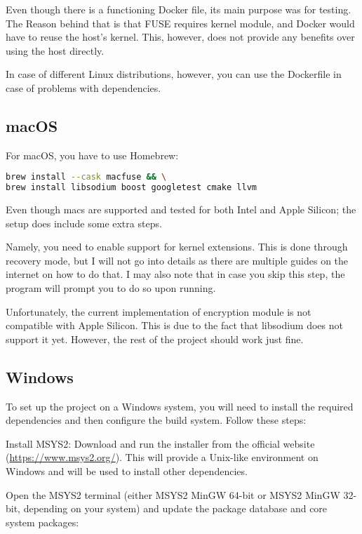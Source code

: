 Even though there is a functioning Docker file, its main purpose was for testing.
The Reason behind that is that FUSE requires kernel module, and Docker would have to reuse the host's kernel.
This, however, does not provide any benefits over using the host directly.

In case of different Linux distributions, however, you can use the Dockerfile in case of problems with dependencies.

\subsection*{macOS}

For macOS, you have to use Homebrew:

\begin{lstlisting}[language=bash, basicstyle=\ttfamily\small]
brew install --cask macfuse && \
brew install libsodium boost googletest cmake llvm
\end{lstlisting}

Even though macs are supported and tested for both Intel and Apple Silicon; the setup does include some extra steps.

Namely, you need to enable support for kernel extensions.
This is done through recovery mode, but I will not go into details as there are multiple guides on the internet on how to do that\cite{macos-kext}.
I may also note that in case you skip this step, the program will prompt you to do so upon running.

Unfortunately, the current implementation of encryption module is not compatible with Apple Silicon.
This is due to the fact that libsodium does not support it yet.
However, the rest of the project should work just fine.

\subsection*{Windows}


To set up the project on a Windows system, you will need to install the required dependencies and then configure the build system.
Follow these steps:

Install MSYS2: Download and run the installer from the official website (\url{https://www.msys2.org/}). This will provide a Unix-like environment on Windows and will be used to install other dependencies.

Open the MSYS2 terminal (either MSYS2 MinGW 64-bit or MSYS2 MinGW 32-bit, depending on your system) and update the package database and core system packages:

